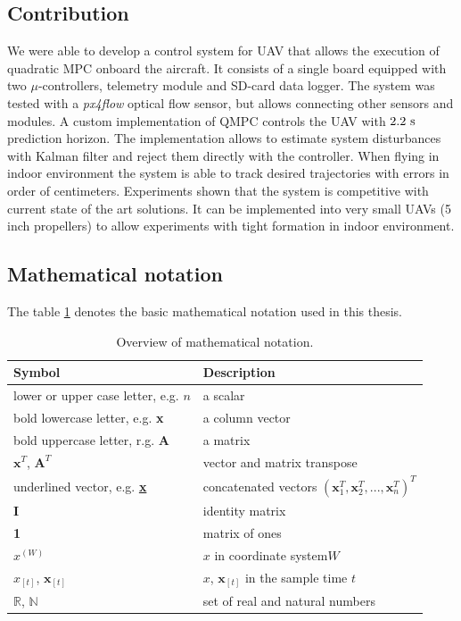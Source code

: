 \subsection{Contribution}

We were able to develop a control system for UAV that allows the execution of quadratic MPC onboard the aircraft. It consists of a single board equipped with two $\mu$-controllers, telemetry module and SD-card data logger. The system was tested with a \textit{px4flow} optical flow sensor, but allows connecting other sensors and modules. A custom implementation of QMPC controls the UAV with $2.2~\mathrm{s}$ prediction horizon. The implementation allows to estimate system disturbances with Kalman filter and reject them directly with the controller. When flying in indoor environment the system is able to track desired trajectories with errors in order of centimeters. Experiments shown that the system is competitive with current state of the art solutions. It can be implemented into very small UAVs (5 inch propellers) to allow experiments with tight formation in indoor environment.

\subsection{Mathematical notation}

The table \ref{tab:notation} denotes the basic mathematical notation used in this thesis.

\begin{table}[h]
\centering
\begin{tabular}{ll}
\hline
Symbol & Description \\
\hline
lower or upper case letter, e.g. $n$ & a scalar \\
bold lowercase letter, e.g. \textbf{x} & a column vector \\ 
bold uppercase letter, r.g. \textbf{A} & a matrix \\
$\textbf{x}^T$, $\textbf{A}^T$ & vector and matrix transpose \\
underlined vector, e.g. \textbf{\underline{x}} & concatenated vectors $\left(\textbf{x}_1^T,\textbf{x}_2^T,...,\textbf{x}_n^T\right)^T$ \\
\textbf{I} & identity matrix \\
\textbf{1} & matrix of ones \\
$x^{(W)}$ & $x$ in coordinate system$W$ \\ 
$x_{[t]}$, $\textbf{x}_{[t]}$ & $x$, $\textbf{x}_{[t]}$ in the sample time $t$ \\
$\mathbb{R}$, $\mathbb{N}$ & set of real and natural numbers \\
\hline
\end{tabular}
\caption{Overview of mathematical notation.}
\label{tab:notation}
\end{table}

